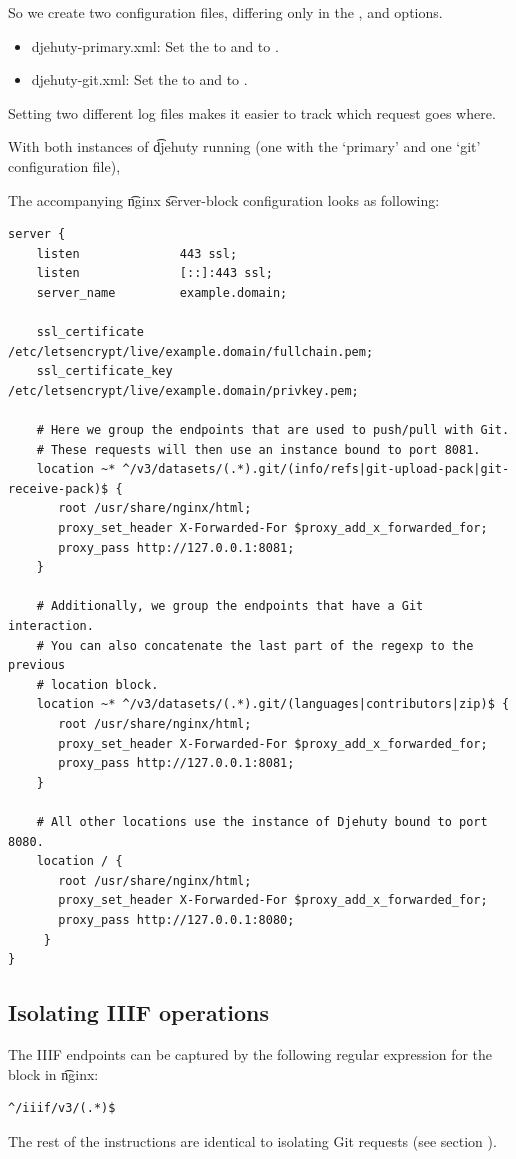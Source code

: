 So we create two configuration files, differing only in the ,
 and  options.
\begin{itemize}
\item{djehuty-primary.xml}: Set the  to
   and  to .
\item{djehuty-git.xml}: Set the  to
   and  to .
\end{itemize}

Setting two different log files makes it easier to track which request goes where.

With both instances of \t{djehuty} running (one with the `primary' and one `git'
configuration file),

The accompanying \t{nginx} \t{server}-block configuration looks as following:
\begin{lstlisting}
server {
    listen              443 ssl;
    listen              [::]:443 ssl;
    server_name         example.domain;

    ssl_certificate     /etc/letsencrypt/live/example.domain/fullchain.pem;
    ssl_certificate_key /etc/letsencrypt/live/example.domain/privkey.pem;

    # Here we group the endpoints that are used to push/pull with Git.
    # These requests will then use an instance bound to port 8081.
    location ~* ^/v3/datasets/(.*).git/(info/refs|git-upload-pack|git-receive-pack)$ {
       root /usr/share/nginx/html;
       proxy_set_header X-Forwarded-For $proxy_add_x_forwarded_for;
       proxy_pass http://127.0.0.1:8081;
    }

    # Additionally, we group the endpoints that have a Git interaction.
    # You can also concatenate the last part of the regexp to the previous
    # location block.
    location ~* ^/v3/datasets/(.*).git/(languages|contributors|zip)$ {
       root /usr/share/nginx/html;
       proxy_set_header X-Forwarded-For $proxy_add_x_forwarded_for;
       proxy_pass http://127.0.0.1:8081;
    }

    # All other locations use the instance of Djehuty bound to port 8080.
    location / {
       root /usr/share/nginx/html;
       proxy_set_header X-Forwarded-For $proxy_add_x_forwarded_for;
       proxy_pass http://127.0.0.1:8080;
     }
}
\end{lstlisting}

\subsection{Isolating IIIF operations}

  The IIIF endpoints can be captured by the following regular expression for
  the  block in \t{nginx}:

\begin{lstlisting}
^/iiif/v3/(.*)$
\end{lstlisting}

  The rest of the instructions are identical to isolating Git requests (see
  section ).
